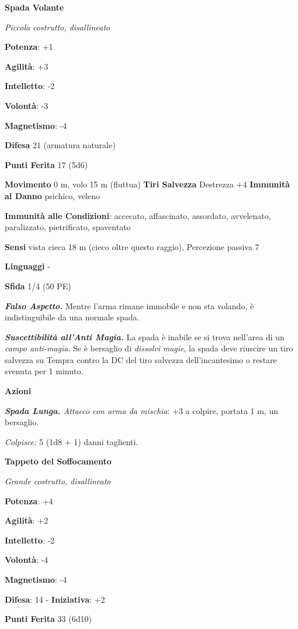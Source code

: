 \begin{multicols}{2}
\textbf{Spada Volante}

\emph{Piccola costrutto, disallineato}

\textbf{Potenza}: +1

\textbf{Agilità}: +3

\textbf{Intelletto}: -2

\textbf{Volontà}: -3

\textbf{Magnetismo}: -4

\textbf{Difesa} 21 (armatura naturale)

\textbf{Punti Ferita} 17 (5d6)

\textbf{Movimento} 0 m, volo 15 m (fluttua) \textbf{Tiri Salvezza}
Destrezza +4 \textbf{Immunità al Danno} psichico, veleno

\textbf{Immunità alle Condizioni}: accecato, affascinato, assordato,
avvelenato, paralizzato, pietrificato, spaventato

\textbf{Sensi} vista cieca 18 m (cieco oltre questo raggio), Percezione
passiva 7

\textbf{Linguaggi} -

\textbf{Sfida} 1/4 (50 PE)\smallskip

\emph{\textbf{Falso Aspetto.}} Mentre l'arma rimane immobile e non sta
volando, è indistinguibile da una normale spada.

\emph{\textbf{Suscettibilità all'Anti Magia.}} La spada è inabile se si
trova nell'area di un \emph{campo anti-magia}. Se è bersaglio di
\emph{dissolvi} \emph{magie}, la spada deve riuscire un tiro salvezza su Tempra contro la DC del tiro salvezza dell'incantesimo o restare
svenuta per 1 minuto.

\smallskip\textbf{Azioni}

\emph{\textbf{Spada Lunga.} Attacco con arma da mischia}: +3 a colpire,
portata 1 m, un bersaglio.

\emph{Colpisce:} 5 (1d8 + 1) danni taglienti.



\textbf{Tappeto del Soffocamento}

\emph{Grande costrutto, disallineato}

\textbf{Potenza}: +4

\textbf{Agilità}: +2

\textbf{Intelletto}: -2

\textbf{Volontà}: -4

\textbf{Magnetismo}: -4

\textbf{Difesa}: 14 - \textbf{Iniziativa}: +2

\textbf{Punti Ferita} 33 (6d10)


\end{multicols}
